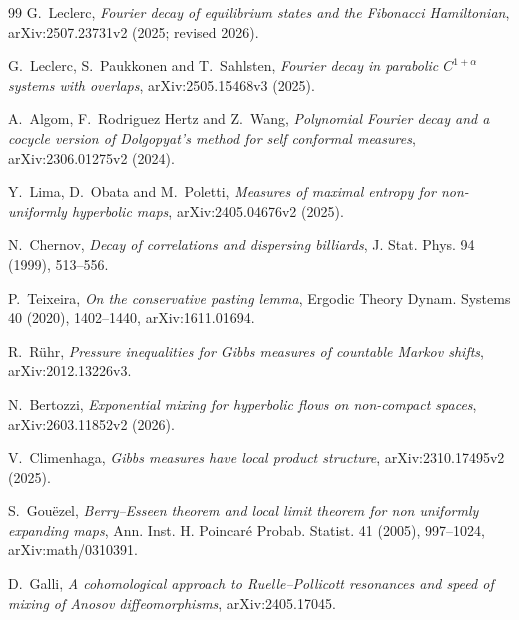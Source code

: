 \documentclass[11pt]{article}
\begin{document}
\begin{thebibliography}{99}
G.~Leclerc,
\emph{Fourier decay of equilibrium states and the Fibonacci Hamiltonian},
arXiv:2507.23731v2 (2025; revised 2026).

G.~Leclerc, S.~Paukkonen and T.~Sahlsten,
\emph{Fourier decay in parabolic $C^{1+\alpha}$ systems with overlaps},
arXiv:2505.15468v3 (2025).

A.~Algom, F.~Rodriguez Hertz and Z.~Wang,
\emph{Polynomial Fourier decay and a cocycle version of Dolgopyat's method
for self conformal measures}, arXiv:2306.01275v2 (2024).

Y.~Lima, D.~Obata and M.~Poletti,
\emph{Measures of maximal entropy for non-uniformly hyperbolic maps},
arXiv:2405.04676v2 (2025).

N.~Chernov,
\emph{Decay of correlations and dispersing billiards},
J. Stat. Phys. 94 (1999), 513--556.

P.~Teixeira,
\emph{On the conservative pasting lemma},
Ergodic Theory Dynam. Systems 40 (2020), 1402--1440,
arXiv:1611.01694.

R.~R\"uhr,
\emph{Pressure inequalities for Gibbs measures of countable Markov shifts},
arXiv:2012.13226v3.

N.~Bertozzi,
\emph{Exponential mixing for hyperbolic flows on non-compact spaces},
arXiv:2603.11852v2 (2026).

V.~Climenhaga,
\emph{Gibbs measures have local product structure},
arXiv:2310.17495v2 (2025).

S.~Gou\"ezel,
\emph{Berry--Esseen theorem and local limit theorem for non uniformly
expanding maps}, Ann. Inst. H. Poincar\'e Probab. Statist. 41 (2005),
997--1024, arXiv:math/0310391.

D.~Galli,
\emph{A cohomological approach to Ruelle--Pollicott resonances and speed of
mixing of Anosov diffeomorphisms}, arXiv:2405.17045.
\end{thebibliography}
\endgroup
\end{document}
